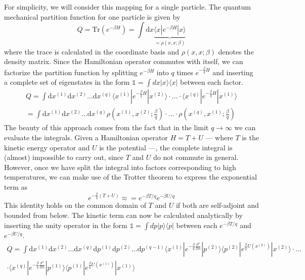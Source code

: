 For simplicity, we will consider this mapping for a single particle. The quantum mechanical partition function for one particle is given by 
\begin{equation}
Q = \text{Tr}\left(e^{-\beta H}\right) = \int \text{d}x \underbrace{\langle x | e^{-\beta H} | x \rangle}_{=\rho(x, x; \beta)}
\end{equation}
where the trace is calculated in the coordinate basis and $\rho(x, x; \beta)$ denotes the density matrix. Since the Hamiltonian operator commutes with itself, we can factorize the partition function by splitting $e^{-\beta H}$ into $q$ times $e^{-\frac{\beta}{q} H}$ and inserting a complete set of eigenstates in the form $\mathbb{1} = \int dx  | x \rangle \langle x | $ between each factor.
\begin{equation}
\begin{split}
Q = \int \text{d}x^{(1)}\text{d}x^{(2)}\ldots \text{d}x^{(q)} \langle x^{(1)} | e^{-\frac{\beta}{q} H}| x^{(2)}\rangle\cdot \ldots\cdot \langle x^{(q)} | e^{-\frac{\beta}{q} H}| x^{(1)}\rangle \\
= \int \text{d}x^{(1)}\text{d}x^{(2)}\ldots \text{d}x^{(q)} \rho(x^{(1)}, x^{(2)}; \frac{\beta}{q})\cdot \ldots \cdot \rho(x^{(q)}, x^{(1)}; \frac{\beta}{q})
\end{split}
\end{equation}  
The beauty of this approach comes from the fact that in the limit $q \rightarrow \infty$ we can evaluate the integrals. Given a Hamiltonian operator $H = T + U$ --- where  $T$ is the kinetic energy operator and $U$ is the potential ---, the complete integral is (almost) impossible to carry out, since $T$ and $U$ do not commute in general. However, once we have split the integral into factors corresponding to high temperatures, we can make use of the Trotter theorem to express the exponential term as 
\begin{equation}
e^{-\frac{\beta}{q}\left(T + U\right)} \approx = e^{-\beta T/q}e^{-\beta U/q}
\end{equation}
This identity holds on the common domain of $T$ and $U$ if both are self-adjoint and bounded from below.  The kinetic term can now be calculated analytically by inserting the unity operator in the form $\mathbb{1} = \int dp  | p \rangle \langle p | $ between each $e^{-\beta T/q}$ and $e^{-\beta U/q}$.
\begin{equation}
\begin{split}
Q = \int \text{d}x^{(1)}\text{d}x^{(2)} \ldots \text{d}x^{(q)}\text{d}p^{(1)}\text{d}p^{(2)}\ldots \text{d}p^{(q-1)} \langle x^{(1)} | e^{-\frac{\beta}{q} \frac{p^2}{2m}}| p^{(2)} \rangle \langle p^{(2)} | e^{\frac{\beta}{q}U(x^{(2)})}| x^{(2)}\rangle\cdot \ldots \\
\cdot \langle x^{(q)} | e^{-\frac{\beta}{q} \frac{p^2}{2m}}| p^{(1)} \rangle \langle p^{(1)} | e^{\frac{\beta}{q}U(x^{(1)})} | x^{(1)}\rangle
\end{split}
\end{equation}
